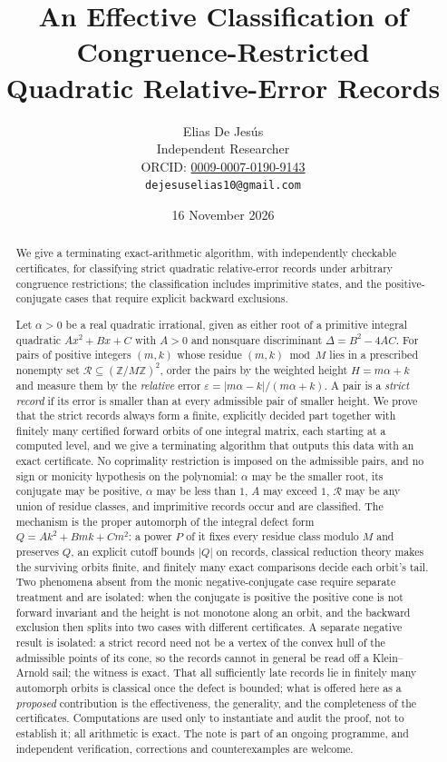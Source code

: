 \documentclass[11pt]{article}
\title{An Effective Classification of Congruence-Restricted\\
Quadratic Relative-Error Records}
\author{Elias De Jes\'us\\
\small Independent Researcher\\
\small ORCID: \href{https://orcid.org/0009-0007-0190-9143}{0009-0007-0190-9143}\\
\small \texttt{dejesuselias10@gmail.com}}
\date{16 November 2026}
\theoremstyle{definition}
\theoremstyle{remark}
\newcommand{\Z}{\mathbb{Z}}
\begin{document}
\maketitle

\begin{abstract}
We give a terminating exact-arithmetic algorithm, with independently checkable certificates,
for classifying strict quadratic relative-error records under arbitrary congruence
restrictions; the classification includes imprimitive states, and the positive-conjugate cases
that require explicit backward exclusions.

Let $\alpha>0$ be a real quadratic irrational, given as either root of a primitive integral
quadratic $Ax^2+Bx+C$ with $A>0$ and nonsquare discriminant $\Delta=B^2-4AC$. For pairs of
positive integers $(m,k)$ whose residue $(m,k)\bmod M$ lies in a prescribed nonempty set
$\mathcal R\subseteq(\Z/M\Z)^2$, order the pairs by the weighted height $H=m\alpha+k$ and
measure them by the \emph{relative} error $\varepsilon=|m\alpha-k|/(m\alpha+k)$. A pair is a
\emph{strict record} if its error is smaller than at every admissible pair of smaller height.
We prove that the strict records always form a finite, explicitly decided part together with
finitely many certified forward orbits of one integral matrix, each starting at a computed
level, and we give a terminating algorithm that outputs this data with an exact certificate.
No coprimality restriction is imposed on the admissible pairs, and no sign or monicity
hypothesis on the polynomial: $\alpha$ may be the
smaller root, its conjugate may be positive, $\alpha$ may be less than $1$, $A$ may exceed $1$,
$\mathcal R$ may be any union of residue classes, and imprimitive records occur and are
classified. The mechanism is the proper automorph of the integral defect form
$Q=Ak^2+Bmk+Cm^2$: a power $P$ of it fixes every residue class modulo $M$ and preserves $Q$, an
explicit cutoff bounds $|Q|$ on records, classical reduction theory makes the surviving orbits
finite, and finitely many exact comparisons decide each orbit's tail. Two phenomena absent from
the monic negative-conjugate case require separate treatment and are isolated: when the
conjugate is positive the positive cone is not forward invariant and the height is not monotone
along an orbit, and the backward exclusion then splits into two cases with different
certificates. A separate negative result is isolated: a strict record need not be a vertex of
the convex hull of the admissible points of its cone, so the records cannot in general be read
off a Klein--Arnold sail; the witness is exact. That all sufficiently late records lie in
finitely many automorph orbits is classical once the defect is bounded; what is offered here as
a \emph{proposed} contribution is the effectiveness, the generality, and the completeness of the
certificates. Computations are used only to instantiate and audit the proof, not to establish
it; all arithmetic is exact. The note is part of an ongoing programme, and independent
verification, corrections and counterexamples are welcome.
\end{abstract}
\end{document}
